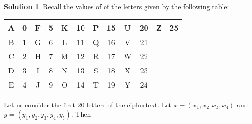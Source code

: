 \documentclass[11pt]{article}
\theoremstyle{definition}\newtheorem{definition}{Definition}
\theoremstyle{definition}\newtheorem{question}{Question}
\theoremstyle{definition}\newtheorem*{solution}{Solution}
\begin{document}
\begin{solution}
    Recall the values of of the letters given by the following table:
    \begin{center}
        \begin{tabular}{|c|c|c|c|c|c|c|c|c|c|c|c|}
            \hline
            A & 0 & F & 5 & K & 10 & P & 15 & U & 20 & Z & 25 \\ \hline
            B & 1 & G & 6 & L & 11 & Q & 16 & V & 21 &   &    \\ \hline
            C & 2 & H & 7 & M & 12 & R & 17 & W & 22 &   &    \\ \hline
            D & 3 & I & 8 & N & 13 & S & 18 & X & 23 &   &    \\ \hline
            E & 4 & J & 9 & O & 14 & T & 19 & Y & 24 &   &    \\ \hline
        \end{tabular}
    \end{center}
    Let us consider the first 20 letters of the ciphertext. Let $x = (x_1, x_2, x_3, x_4)$ and $y = (y_1, y_2, y_3, y_4, y_5)$. Then
    \begin{table}[h]
        \centering
\end{table}
\end{solution}
\end{document}

